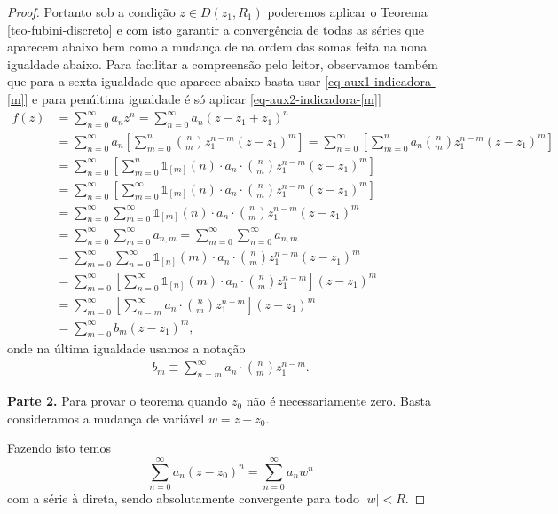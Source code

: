 \begin{proof}
\bigskip 
Portanto sob a condição $z\in D(z_1,R_{1})$ poderemos aplicar o Teorema \ref{teo-fubini-discreto} e com isto garantir
a convergência de todas as séries que aparecem abaixo bem como a mudança de 
na ordem das somas feita na nona igualdade abaixo. 
Para facilitar a compreensão pelo leitor, 
observamos também que para a sexta igualdade
que aparece abaixo basta usar \eqref{eq-aux1-indicadora-[m]} e para penúltima
igualdade é só aplicar \eqref{eq-aux2-indicadora-[m]}
\begin{align*}
f(z)
&=
\sum_{n=0}^{\infty} a_nz^n
=
\sum_{n=0}^{\infty} a_n(z-z_1+z_1)^n
\\
&=
\sum_{n=0}^{\infty} a_n \left[ \sum_{m=0}^n \binom{n}{m}z_1^{n-m}(z-z_1)^m  \right]
=
\sum_{n=0}^{\infty}  \left[ \sum_{m=0}^n a_n\binom{n}{m}z_1^{n-m}(z-z_1)^m  \right]
\\
&=
\sum_{n=0}^{\infty}  \left[ \sum_{m=0}^n 
\mathds{1}_{[m]}(n)\cdot a_n\cdot \binom{n}{m}z_1^{n-m}(z-z_1)^m  \right]
\\
&=
\sum_{n=0}^{\infty}  \left[ \sum_{m=0}^{\infty} 
\mathds{1}_{[m]}(n)\cdot a_n\cdot \binom{n}{m}z_1^{n-m}(z-z_1)^m  \right]
\\
&=
\sum_{n=0}^{\infty}  
\sum_{m=0}^{\infty} 
\mathds{1}_{[m]}(n)\cdot a_n\cdot \binom{n}{m}z_1^{n-m}(z-z_1)^m  
\\
&=
\sum_{n=0}^{\infty}  
\sum_{m=0}^{\infty} 
a_{n,m}
=
\sum_{m=0}^{\infty} 
\sum_{n=0}^{\infty}  
a_{n,m}
\\
&=
\sum_{m=0}^{\infty} \sum_{n=0}^{\infty} 
\mathds{1}_{[n]}(m)\cdot a_n\cdot \binom{n}{m}z_1^{n-m}
(z-z_1)^m
\\
&=
\sum_{m=0}^{\infty}  \left[ \sum_{n=0}^{\infty} 
\mathds{1}_{[n]}(m)\cdot a_n\cdot \binom{n}{m}z_1^{n-m}  \right]
(z-z_1)^m
\\
&=
\sum_{m=0}^{\infty}  
\left[ 
\sum_{n=m}^{\infty}  a_n\cdot \binom{n}{m}z_1^{n-m}  \right]
(z-z_1)^m
\\
&=
\sum_{m=0}^{\infty} b_m(z-z_1)^m,
\end{align*}
onde na última igualdade usamos a notação
\begin{align}\label{eq-aux1-teo-series-pot-analiticas}
b_m \equiv \sum_{n=m}^{\infty}  a_n\cdot \binom{n}{m}z_1^{n-m}.
\end{align}

\bigskip 

\noindent\textbf {Parte 2.}
Para provar o teorema quando $z_0$ não é necessariamente zero.
Basta consideramos a mudança de variável $w=z-z_0$.

Fazendo isto temos 
\[
\sum_{n=0}^{\infty}a_n(z-z_0)^n 
=
\sum_{n=0}^{\infty}a_n w^n 
\]
com a série à direta, sendo absolutamente convergente para todo $|w|<R$.


\end{proof}
